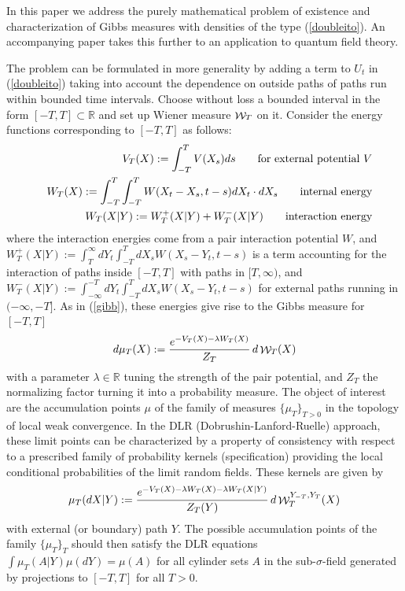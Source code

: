 \documentclass[a4paper,11pt]{article}
\newcommand{\R}{\mathbb{R}}
\newcommand{\W}{\mathop{\mathrm{{\cal W}}}\nolimits}
\begin{document}
\medskip
In this paper we address the purely mathematical problem of existence
and characterization of Gibbs measures with densities of the type 
(\ref{doubleito}). An accompanying paper \cite{GL} takes this further 
to an application to quantum field theory. 

The problem can be formulated in more generality by adding a term 
to $U_t$ in (\ref{doubleito}) taking into account the dependence on 
outside paths of paths run within bounded time intervals. Choose
without loss a bounded interval in the form $[-T,T] \subset \R$ and 
set up Wiener measure $\W_T$ on it. Consider the energy functions 
corresponding to $[-T,T]$ as follows: 
\begin{eqnarray*}
&&
V_T(X) := \int_{-T}^T  V(X_s) ds \qquad \mbox{for external 
potential $V$}\\
\bigskip
&&
W_T(X) :=  \int_{-T}^T \int_{-T}^T W(X_t-X_s,t-s) dX_t \cdot dX_s 
\qquad \mbox{internal energy} \\ 
\medskip\bigskip
&&
W_T(X|Y):= W^+_T(X|Y) + W^{-}_T(X|Y) \qquad 
\mbox{interaction energy}
\end{eqnarray*}
where the interaction energies come from a pair interaction 
potential $W$, and $W^+_T(X|Y) := \int_T^\infty dY_t \int_{-T}^T 
dX_s W(X_s-Y_t,t-s)$ is a term accounting for the interaction of 
paths inside $[-T,T]$ with paths in $[T,\infty)$, and $W^-_T(X|Y) 
:= \int_{-\infty}^{-T} dY_t \int_{-T}^T dX_s W(X_s-Y_t,t-s)$ for 
external paths running in $(-\infty,-T]$. As in (\ref{gibb}), 
these energies give rise to the Gibbs measure for $[-T,T]$
\begin{equation}
\label{ea:gibbs1}
d\mu_T(X) := \frac{e^{-V_T(X)-\lambda W_T(X)}}{Z_T}\, d\W_T(X)
\end{equation}
with a parameter $\lambda \in \R$ tuning the strength of the pair 
potential, and $Z_T$ the normalizing factor turning it into a
probability measure. The object of interest are the accumulation 
points $\mu$ of the family of measures $\{\mu_{T}\}_{T>0}$ in the 
topology of local weak convergence. In the DLR 
(Dobrushin-Lanford-Ruelle) approach, these limit points can be 
characterized by a property of consistency with respect to a 
prescribed family of probability kernels (specification) providing
the local conditional probabilities of the limit random fields. These 
kernels are given by 
\begin{equation}
\label{eq:specc}
\mu_T(dX|Y) := \frac{e^{-V_T(X)-\lambda W_T(X)-
\lambda W_T(X|Y)}}{Z_T(Y)} \, d\W^{Y_{-T},Y_{T}}_T(X)
\end{equation}
with external (or boundary) path $Y$. The possible accumulation 
points of the family $\{\mu_T\}_T$ should then satisfy the DLR 
equations
$
\int \mu_T(A|Y) \mu(dY) = \mu(A)
$ 
for all cylinder sets $A$ in the sub-$\sigma$-field generated by 
projections to $[-T,T]$ for all $T>0$.
\end{document}
